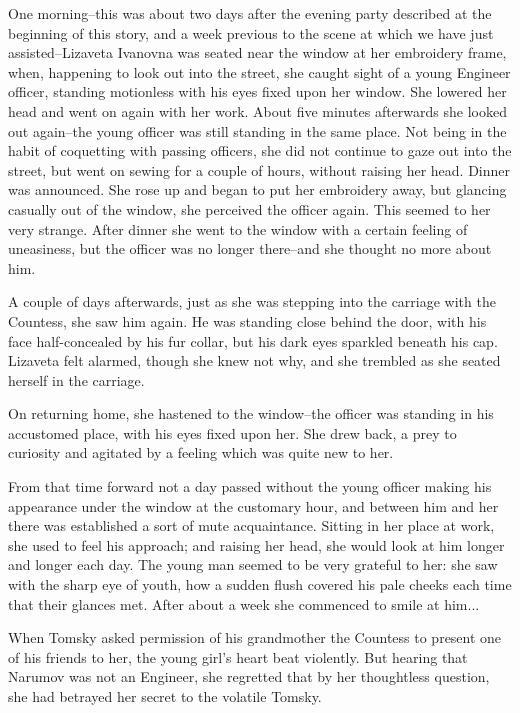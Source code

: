 One morning--this was about two days after the evening party described
at the beginning of this story, and a week previous to the scene at
which we have just assisted--Lizaveta Ivanovna was seated near the
window at her embroidery frame, when, happening to look out into the
street, she caught sight of a young Engineer officer, standing
motionless with his eyes fixed upon her window. She lowered her head
and went on again with her work. About five minutes afterwards she
looked out again--the young officer was still standing in the same
place. Not being in the habit of coquetting with passing officers, she
did not continue to gaze out into the street, but went on sewing for a
couple of hours, without raising her head. Dinner was announced. She
rose up and began to put her embroidery away, but glancing casually
out of the window, she perceived the officer again. This seemed to her
very strange. After dinner she went to the window with a certain
feeling of uneasiness, but the officer was no longer there--and she
thought no more about him.

A couple of days afterwards, just as she was stepping into the
carriage with the Countess, she saw him again. He was standing close
behind the door, with his face half-concealed by his fur collar, but
his dark eyes sparkled beneath his cap. Lizaveta felt alarmed, though
she knew not why, and she trembled as she seated herself in the
carriage.

On returning home, she hastened to the window--the officer was
standing in his accustomed place, with his eyes fixed upon her. She
drew back, a prey to curiosity and agitated by a feeling which was
quite new to her.

From that time forward not a day passed without the young officer
making his appearance under the window at the customary hour, and
between him and her there was established a sort of mute acquaintance.
Sitting in her place at work, she used to feel his approach; and
raising her head, she would look at him longer and longer each day.
The young man seemed to be very grateful to her: she saw with the
sharp eye of youth, how a sudden flush covered his pale cheeks each
time that their glances met. After about a week she commenced to smile
at him...

When Tomsky asked permission of his grandmother the Countess to
present one of his friends to her, the young girl's heart beat
violently. But hearing that Narumov was not an Engineer, she regretted
that by her thoughtless question, she had betrayed her secret to the
volatile Tomsky.

